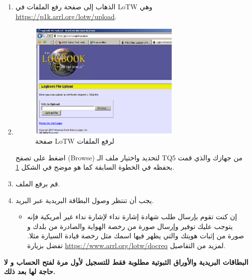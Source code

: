 \documentclass[a4paper,12pt]{article}
\begin{document}
\begin{enumerate}
		\item
			الذهاب إلى صفحة رفع الملفات في \textenglish{LoTW} وهي \href{https://p1k.arrl.org/lotw/upload}{\textenglish{https://p1k.arrl.org/lotw/upload}}.
		\item
			\begin{figure}[!hbtp]
			\centering
			\includegraphics[width=0.7\textwidth]{LoTWUpload.eps}
			\caption{صفحة LoTW لرفع الملفات}
			\label{fig:LoTW}
			\end{figure}
			
			اضغط على تصفح (\textenglish{Browse}) لتحديد واختيار ملف الـ \textenglish{TQ5} من جهازك والذي قمت بحفظه في الخطوة السابقة كما هو موضح في الشكل \ref{fig:LoTW}.
			
		\item
			قم برفع الملف.
		\item
			يجب أن تنتظر وصول البطاقة البريدية عبر البريد.

			\begin{itemize}
					\item
						إن كنت تقوم بإرسال طلب شهادة إشارة نداء لإشارة نداء غير أمريكية فإنه يتوجب عليك توفير وإرسال صورة من رخصة الهواية والصادرة من بلدك و صورة من إثبات هويتك والتي يظهر فيها اسمك مثل رخصة قيادة السيارة مثلا. تفضل بزيارة \href{https://www.arrl.org/lotw/docreq}{\textenglish{https://www.arrl.org/lotw/docreq}} لمزيد من التفاصيل.
			\end{itemize}
\end{enumerate}

{\large\textbf{{\color{oucrimsonred}البطاقات البريدية والأوراق الثبوتية مطلوبة فقط للتسجيل لأول مرة لفتح الحساب و لا حاجة لها بعد ذلك.}}}

\vspace{20pt}
\begin{center}
	\color{slategray2}
{\Huge\hrulefill\hspace{0.2cm} \floweroneright\floweroneleft \hspace{0.2cm} \hrulefill}
\end{center}
\newpage
\end{document}
